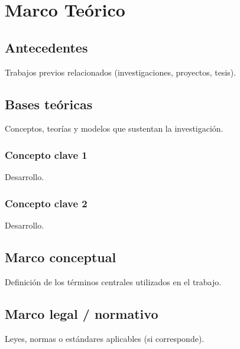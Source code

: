 \chapter{Marco Teórico}
\label{cap:marco-teorico}



\section{Antecedentes}

Trabajos previos relacionados (investigaciones, proyectos, tesis).

\section{Bases teóricas}

Conceptos, teorías y modelos que sustentan la investigación.

\subsection{Concepto clave 1}
Desarrollo.

\subsection{Concepto clave 2}
Desarrollo.

\section{Marco conceptual}

Definición de los términos centrales utilizados en el trabajo.

\section{Marco legal / normativo}

Leyes, normas o estándares aplicables (si corresponde).
